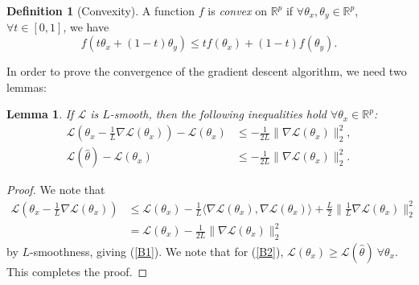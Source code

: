 \documentclass[a4paper,11pt,titlepage]{article}
\theoremstyle{definition}
\newtheorem{definition}{Definition}[section]
\theoremstyle{plain}
\newtheorem{lemma}[theorem]{Lemma}
\theoremstyle{remark}
\begin{document}
\begin{definition}[Convexity]
    A function $f$ is \textit{convex} on $\mathbb{R}^p$ if $\forall \theta_x, \theta_y \in \mathbb{R}^p$, $\forall t \in [0, 1]$, we have
    $$
    f(t\theta_x + (1 - t)\theta_y) \leq tf(\theta_x) + (1-t)f(\theta_y).
    $$
\end{definition}

In order to prove the convergence of the gradient descent algorithm, we need two lemmas:

\begin{lemma}
    If $\mathcal{L}$ is $L$-smooth, then the following inequalities hold $\forall  \theta_x \in \mathbb{R}^p$: 
    \begin{align}
        \mathcal{L}(\theta_x - \frac{1}{L}\nabla \mathcal{L}(\theta_x)) - \mathcal{L}(\theta_x) &\leq -\frac{1}{2L} \| \nabla \mathcal{L}(\theta_x)\|_2^2, \label{B1} \\
        \mathcal{L}(\hat{\theta}) - \mathcal{L}(\theta_x) &\leq -\frac{1}{2L}\|\nabla \mathcal{L}(\theta_x)\|_2^2. \label{B2}
    \end{align}
\end{lemma}
\begin{proof}
    We note that
    \begin{align*}
        \mathcal{L}(\theta_x - \frac{1}{L}\nabla \mathcal{L}(\theta_x)) &\leq \mathcal{L}(\theta_x) - \frac{1}{L} \langle\nabla \mathcal{L}(\theta_x), \nabla \mathcal{L}(\theta_x)\rangle + \frac{L}{2} \|\frac{1}{L}\nabla \mathcal{L}(\theta_x) \|_2^2 \\
        &= \mathcal{L}(\theta_x) - \frac{1}{2L}\| \nabla \mathcal{L}(\theta_x)\|_2^2
    \end{align*}
    by $L$-smoothness, giving (\ref{B1}). We note that for (\ref{B2}), $\mathcal{L}(\theta_x) \geq \mathcal{L}(\hat{\theta}) \ \forall \theta_x$. This completes the proof.
\end{proof}
\end{document}
